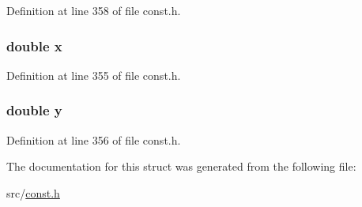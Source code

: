 Definition at line 358 of file const.\+h.

\hypertarget{structd__rho_af88b946fb90d5f08b5fb740c70e98c10}{}
\subsubsection[{x}]{\setlength{\rightskip}{0pt plus 5cm}double x}\label{structd__rho_af88b946fb90d5f08b5fb740c70e98c10}


Definition at line 355 of file const.\+h.

\hypertarget{structd__rho_ab927965981178aa1fba979a37168db2a}{}
\subsubsection[{y}]{\setlength{\rightskip}{0pt plus 5cm}double y}\label{structd__rho_ab927965981178aa1fba979a37168db2a}


Definition at line 356 of file const.\+h.



The documentation for this struct was generated from the following file\+:\begin{DoxyCompactItemize}
\item 
src/\hyperlink{const_8h}{const.\+h}\end{DoxyCompactItemize}
